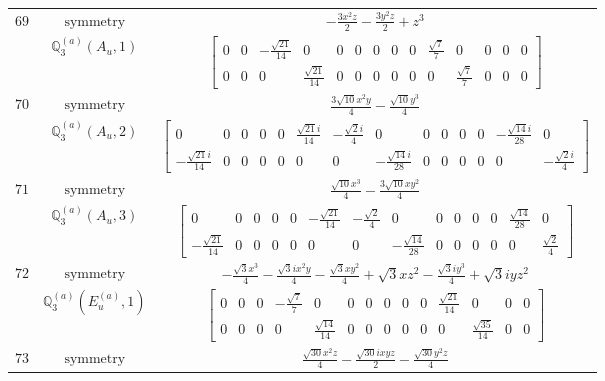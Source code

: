 \documentclass[fleqn,8pt,landscape]{jsarticle}
\begin{document}
\begin{longtable}{ccc}
$ 69 $ & $ \text{symmetry} $ & $ - \frac{3 x^{2} z}{2} - \frac{3 y^{2} z}{2} + z^{3} $ \\
$  $ & $ \mathbb{Q}_{3}^{(a)}(A_{u},1) $ & $ \begin{bmatrix} 0 & 0 & - \frac{\sqrt{21}}{14} & 0 & 0 & 0 & 0 & 0 & 0 & \frac{\sqrt{7}}{7} & 0 & 0 & 0 & 0 \\ 0 & 0 & 0 & \frac{\sqrt{21}}{14} & 0 & 0 & 0 & 0 & 0 & 0 & \frac{\sqrt{7}}{7} & 0 & 0 & 0 \end{bmatrix} $ \\ \hline
$ 70 $ & $ \text{symmetry} $ & $ \frac{3 \sqrt{10} x^{2} y}{4} - \frac{\sqrt{10} y^{3}}{4} $ \\
$  $ & $ \mathbb{Q}_{3}^{(a)}(A_{u},2) $ & $ \begin{bmatrix} 0 & 0 & 0 & 0 & 0 & \frac{\sqrt{21} i}{14} & - \frac{\sqrt{2} i}{4} & 0 & 0 & 0 & 0 & 0 & - \frac{\sqrt{14} i}{28} & 0 \\ - \frac{\sqrt{21} i}{14} & 0 & 0 & 0 & 0 & 0 & 0 & - \frac{\sqrt{14} i}{28} & 0 & 0 & 0 & 0 & 0 & - \frac{\sqrt{2} i}{4} \end{bmatrix} $ \\ \hline
$ 71 $ & $ \text{symmetry} $ & $ \frac{\sqrt{10} x^{3}}{4} - \frac{3 \sqrt{10} x y^{2}}{4} $ \\
$  $ & $ \mathbb{Q}_{3}^{(a)}(A_{u},3) $ & $ \begin{bmatrix} 0 & 0 & 0 & 0 & 0 & - \frac{\sqrt{21}}{14} & - \frac{\sqrt{2}}{4} & 0 & 0 & 0 & 0 & 0 & \frac{\sqrt{14}}{28} & 0 \\ - \frac{\sqrt{21}}{14} & 0 & 0 & 0 & 0 & 0 & 0 & - \frac{\sqrt{14}}{28} & 0 & 0 & 0 & 0 & 0 & \frac{\sqrt{2}}{4} \end{bmatrix} $ \\ \hline
$ 72 $ & $ \text{symmetry} $ & $ - \frac{\sqrt{3} x^{3}}{4} - \frac{\sqrt{3} i x^{2} y}{4} - \frac{\sqrt{3} x y^{2}}{4} + \sqrt{3} x z^{2} - \frac{\sqrt{3} i y^{3}}{4} + \sqrt{3} i y z^{2} $ \\
$  $ & $ \mathbb{Q}_{3}^{(a)}(E_{u}^{(a)},1) $ & $ \begin{bmatrix} 0 & 0 & 0 & - \frac{\sqrt{7}}{7} & 0 & 0 & 0 & 0 & 0 & 0 & \frac{\sqrt{21}}{14} & 0 & 0 & 0 \\ 0 & 0 & 0 & 0 & \frac{\sqrt{14}}{14} & 0 & 0 & 0 & 0 & 0 & 0 & \frac{\sqrt{35}}{14} & 0 & 0 \end{bmatrix} $ \\ \hline
$ 73 $ & $ \text{symmetry} $ & $ \frac{\sqrt{30} x^{2} z}{4} - \frac{\sqrt{30} i x y z}{2} - \frac{\sqrt{30} y^{2} z}{4} $ \\

\end{longtable}
\end{document}
